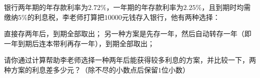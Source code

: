 银行两年期的年存款利率为$2.72\%$，一年期的年存款利率为$2.25\%$，且到期时均需缴纳$5\%$的利息税，李老师打算把$10000$元钱存入银行，他有两种选择：
\begin{subquestions}
\subquestion 直接存两年后，到期全部取出；   
\subquestion 另一种方案是先存一年，然后自动转存一年（即一年到期后连本带利再存一年），到期全部取出；
\end{subquestions}
请你通过计算帮助李老师选择一种两年后能获得较多利息的方案，并比较一下，两种方案的利息差多少元？（除不尽的小数点后保留$1$位小数）